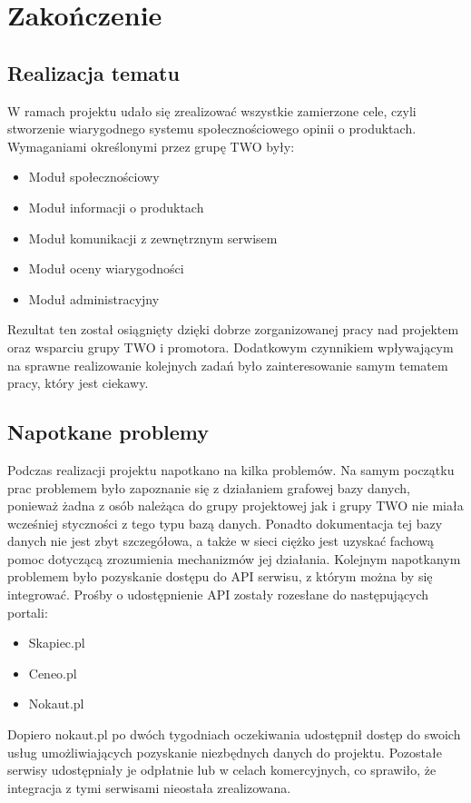 \chapter{Zakończenie}

\section{Realizacja tematu}

W ramach projektu udało się zrealizować wszystkie zamierzone cele, czyli stworzenie wiarygodnego systemu społecznościowego opinii o produktach. Wymaganiami określonymi przez grupę TWO były:
\begin{itemize}
\item Moduł społecznościowy
\item Moduł informacji o produktach
\item Moduł komunikacji z zewnętrznym serwisem
\item Moduł oceny wiarygodności
\item Moduł administracyjny
\end{itemize}
Rezultat ten został osiągnięty dzięki dobrze zorganizowanej pracy nad projektem oraz wsparciu grupy TWO i promotora. Dodatkowym czynnikiem wpływającym na sprawne realizowanie kolejnych zadań było zainteresowanie samym tematem pracy, który jest ciekawy.

\section{Napotkane problemy}

Podczas realizacji projektu napotkano na kilka problemów. Na samym początku prac problemem było zapoznanie się z działaniem grafowej bazy danych, ponieważ żadna z osób należąca do grupy projektowej jak i grupy TWO nie miała wcześniej styczności z tego typu bazą danych. Ponadto dokumentacja tej bazy danych nie jest zbyt szczegółowa, a także w sieci ciężko jest uzyskać fachową pomoc dotyczącą zrozumienia mechanizmów jej działania.
Kolejnym napotkanym problemem było pozyskanie dostępu do API serwisu, z którym można by się integrować. Prośby o udostępnienie API zostały rozesłane do następujących portali:
\begin{itemize}
\item Skapiec.pl
\item Ceneo.pl
\item Nokaut.pl
\end{itemize}
Dopiero nokaut.pl po dwóch tygodniach oczekiwania udostępnił dostęp do swoich usług umożliwiających pozyskanie niezbędnych danych do projektu. Pozostałe serwisy udostępniały je odpłatnie lub w celach komercyjnych, co sprawiło, że integracja z tymi serwisami nieostała zrealizowana.

